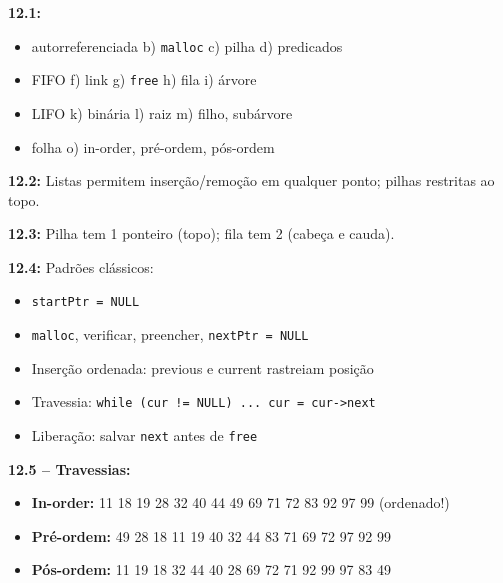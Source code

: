 \documentclass[12pt,a4paper]{article}
\begin{document}
\begin{tcolorbox}[colback=deitellightblue,colframe=deitelblue,title={\bfseries\large Respostas Resumidas}]

\textbf{12.1:}
\begin{itemize}[noitemsep]
  \item[a)] autorreferenciada \quad b) \texttt{malloc} \quad c) pilha \quad d) predicados
  \item[e)] FIFO \quad f) link \quad g) \texttt{free} \quad h) fila \quad i) árvore
  \item[j)] LIFO \quad k) binária \quad l) raiz \quad m) filho, subárvore
  \item[n)] folha \quad o) in-order, pré-ordem, pós-ordem
\end{itemize}

\medskip\textbf{12.2:} Listas permitem inserção/remoção em qualquer ponto; pilhas
restritas ao topo.

\medskip\textbf{12.3:} Pilha tem 1 ponteiro (topo); fila tem 2 (cabeça e cauda).

\medskip\textbf{12.4:} Padrões clássicos:
\begin{itemize}[noitemsep]
  \item[a)] \texttt{startPtr = NULL}
  \item[b)] \texttt{malloc}, verificar, preencher, \texttt{nextPtr = NULL}
  \item[c)] Inserção ordenada: previous e current rastreiam posição
  \item[d)] Travessia: \texttt{while (cur != NULL) ... cur = cur->next}
  \item[e)] Liberação: salvar \texttt{next} antes de \texttt{free}
\end{itemize}

\medskip\textbf{12.5 -- Travessias:}
\begin{itemize}[noitemsep]
  \item \textbf{In-order:} 11 18 19 28 32 40 44 49 69 71 72 83 92 97 99 (ordenado!)
  \item \textbf{Pré-ordem:} 49 28 18 11 19 40 32 44 83 71 69 72 97 92 99
  \item \textbf{Pós-ordem:} 11 19 18 32 44 40 28 69 72 71 92 99 97 83 49
\end{itemize}

\end{tcolorbox}
\end{document}
